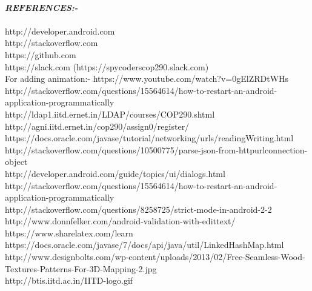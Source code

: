\documentclass[12pt]{article}
\begin{document}
\\
\textbf{\textit{REFERENCES:-}}\\
\\
http://developer.android.com \\
http://stackoverflow.com    \\
https://github.com          \\
https://slack.com   (https://spycoderscop290.slack.com)         \\
For adding animation:- https://www.youtube.com/watch?v=0gElZRDtWHs  \\
http://stackoverflow.com/questions/15564614/how-to-restart-an-android-application-programmatically\\
http://ldap1.iitd.ernet.in/LDAP/courses/COP290.shtml \\
http://agni.iitd.ernet.in/cop290/assign0/register/ \\
https://docs.oracle.com/javase/tutorial/networking/urls/readingWriting.html \\
http://stackoverflow.com/questions/10500775/parse-json-from-httpurlconnection-object \\
http://developer.android.com/guide/topics/ui/dialogs.html\\
http://stackoverflow.com/questions/15564614/how-to-restart-an-android-application-programmatically\\
http://stackoverflow.com/questions/8258725/strict-mode-in-android-2-2\\
http://www.donnfelker.com/android-validation-with-edittext/\\
https://www.sharelatex.com/learn\\
https://docs.oracle.com/javase/7/docs/api/java/util/LinkedHashMap.html\\
http://www.designbolts.com/wp-content/uploads/2013/02/Free-Seamless-Wood-Textures-Patterns-For-3D-Mapping-2.jpg\\
http://btis.iitd.ac.in/IITD-logo.gif\\
\end{document}

